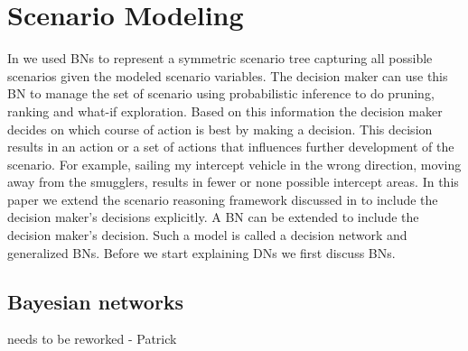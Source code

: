 \documentclass[conference]{IEEEtran}
\begin{document}
\section{Scenario Modeling}
\label{sec:influence-diagrams}

In \cite{conrado14if} we used BNs to represent a symmetric scenario tree capturing all possible scenarios given the modeled scenario variables. The decision maker can use this BN to manage the set of scenario using probabilistic inference to do pruning, ranking and what-if exploration. Based on this information the decision maker decides on which course of action is best by making a decision. This decision results in an action or a set of actions that influences further development of the scenario. For example, sailing my intercept vehicle in the wrong direction, moving away from the smugglers, results in fewer or none possible intercept areas. In this paper we extend the scenario reasoning framework discussed in \cite{conrado14if} to include the decision maker's decisions explicitly. A BN can be extended to include the decision maker's decision. Such a model is called a decision network and generalized BNs. Before we start explaining DNs we first discuss BNs.


\begin{figure}
\begin{center}
 \caption{}
\end{center}
\end{figure}


\subsection{Bayesian networks}\label{sec:bayesian-networks}

{\red needs to be reworked - Patrick}
\end{document}

